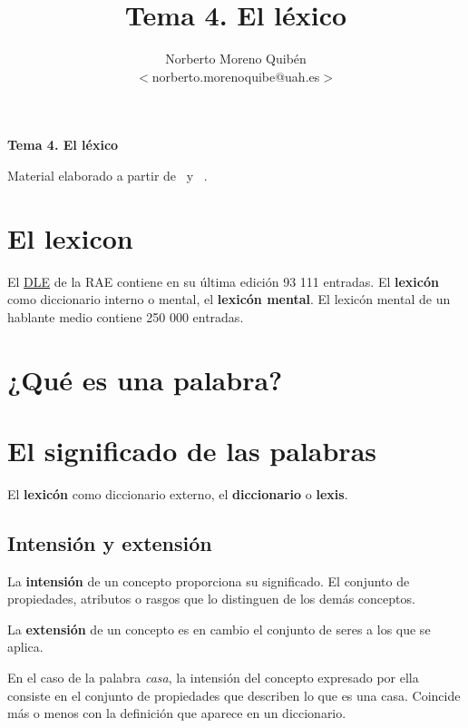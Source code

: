 \documentclass[12pt]{article}
\title{Tema 4. El léxico}
\author{Norberto Moreno Quibén\\
        \small $<$norberto.morenoquibe@uah.es$>$}
\date{}
\begin{document}
\textbf{\Large Tema 4. El léxico}

\tableofcontents

Material elaborado a partir de~\cite{bosque1982sobre-la-teoria,bosque2004combinatoria-y-signi,murphy2010lexicalmeaning,jezek2015the-lexicon-an,pustejovsky2019the-lexicon} y ~\cite[caps. «Lexicología» y «Diccionarios»][]{2016enciclopedia-de-linguistica}.

%
%


\section{El lexicon}

El \href{https://dle.rae.es/?w=diccionario}{DLE} de la RAE contiene en su última edición 93 111 entradas. El \textbf{lexicón} como diccionario interno o mental, el \textbf{lexicón mental}. El lexicón mental de un hablante medio contiene 250 000 entradas.

\section{¿Qué es una palabra?}
\section{El significado de las palabras}

El \textbf{lexicón} como diccionario externo, el \textbf{diccionario} o \textbf{lexis}.

\subsection{Intensión y extensión}

La \textbf{intensión} de un concepto proporciona su significado. El conjunto de propiedades, atributos o rasgos que lo distinguen de los demás conceptos.

La \textbf{extensión} de un concepto es en cambio el conjunto de seres a los que se aplica.

En el caso de la palabra \textit{casa}, la intensión del concepto expresado por ella consiste en el conjunto de propiedades que describen lo que es una casa. Coincide más o menos con la definición que aparece en un diccionario.
\end{document}
